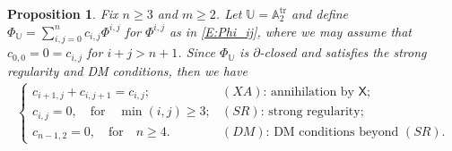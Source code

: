 \documentclass[pdftex]{sigma}%
\DeclareMathOperator{\tr}{tr}
\newcommand\bbU{\mathbb{U}}
\newcommand\bbA{\mathbb{A}}
\newcommand\sfX{\mathsf{X}}
\numberwithin{equation}{section}
\newtheorem{Proposition}[Theorem]{Proposition}
 { \theoremstyle{definition}
\newtheorem{Definition}[Theorem]{Definition}
\newtheorem{Note}[Theorem]{Note}
\newtheorem{Example}[Theorem]{Example}
\newtheorem{Remark}[Theorem]{Remark} }
\begin{document}
\begin{Proposition}\label{P:GS} Fix $n \geq 3$ and $m \geq 2$. Let $\bbU = \bbA_2^{\tr}$ and define $\Phi_{\bbU} = \sum_{i,j=0}^n c_{i,j}\Phi^{i,j}$ for $\Phi^{i,j}$ as in \eqref{E:Phi_ij}, where we may assume that $c_{0,0} = 0 =c_{i,j}$ for $i+j>n+1$. Since $\Phi_\bbU$ is $\partial$-closed and satisfies the strong regularity and DM conditions, then we have
\begin{align} \label{E:GS}
\begin{cases}
c_{i+1,j} + c_{i,j+1} = c_{i,j};& \text{$(XA)$: annihilation by $\sfX$;}\\
c_{i,j}{}= 0,\quad \text{for}\quad \min(i,j)\ge 3;&\text{$(SR)$: strong regularity;}\\
c_{n-1,2}= 0,\quad \text{for}\quad n\ge 4. & \text{$(DM)$: DM conditions beyond $(SR)$.}
\end{cases}
\end{align}
\end{Proposition}
\end{document}
